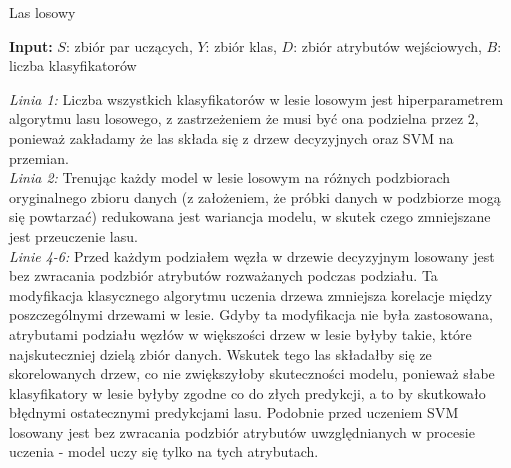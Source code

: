 \documentclass[
    left=2.5cm,         %
    right=2.5cm,        %
    top=2.5cm,          %
    bottom=3cm,         %
    bindingoffset=6mm,  %
    nohyphenation=false %
]{eiti/eiti-report}
\begin{document}
\begin{algorithm}
\caption{Las losowy}\label{alg:cap}
\hspace*{\algorithmicindent} \textbf{Input:} \begin{math}\mathit{S}\end{math}: zbiór par uczących, \begin{math}\mathit{Y}\end{math}: zbiór klas, $D$: zbiór atrybutów wejściowych, $B$: liczba klasyfikatorów
\begin{algorithmic}[1]
    \Else
    \EndIf
\end{algorithmic}
\end{algorithm}

\textit{Linia 1:}
Liczba wszystkich klasyfikatorów w lesie losowym jest hiperparametrem algorytmu lasu losowego, z zastrzeżeniem że musi być ona podzielna przez 2, ponieważ zakładamy że las składa się z drzew decyzyjnych oraz SVM na przemian.\\

\textit{Linia 2:}
Trenując każdy model w lesie losowym na różnych podzbiorach oryginalnego zbioru danych (z założeniem, że próbki danych w podzbiorze mogą się powtarzać) redukowana jest wariancja modelu, w skutek czego zmniejszane jest przeuczenie lasu.\\

\textit{Linie 4-6:}
Przed każdym podziałem węzła w drzewie decyzyjnym losowany jest bez zwracania podzbiór atrybutów rozważanych podczas podziału. Ta modyfikacja klasycznego algorytmu uczenia drzewa zmniejsza korelacje między poszczególnymi drzewami w lesie. Gdyby ta modyfikacja nie była zastosowana, atrybutami podziału węzłów w większości drzew w lesie byłyby takie, które najskuteczniej dzielą zbiór danych. Wskutek tego las składałby się ze skorelowanych drzew, co nie zwiększyłoby skuteczności modelu, ponieważ słabe klasyfikatory w lesie byłyby zgodne co do złych predykcji, a to by skutkowało błędnymi ostatecznymi predykcjami lasu. Podobnie przed uczeniem SVM losowany jest bez zwracania podzbiór atrybutów uwzględnianych w procesie uczenia - model uczy się tylko na tych atrybutach.
\end{document}
